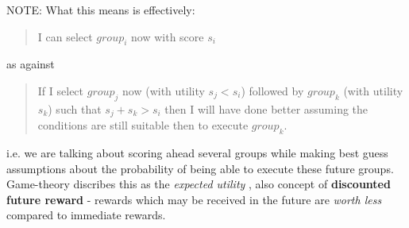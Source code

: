 NOTE: What this means is effectively: 
\begin{quote} 
I can select $group_i$ now with score $s_i$ 
\end{quote}

as against 

\begin{quote}If I select $group_j$ now (with utility $s_j < s_i$) followed by $group_k$ (with utility $s_k$) such that $s_j+s_k > s_i$ then I will have done better assuming the conditions are still suitable then to execute $group_k$.
\end{quote}

 i.e. we are talking about scoring ahead several groups while making best guess assumptions about the probability of being able to execute these future groups. Game-theory discribes this as the \emph{expected utility} \cite{vonneumann44games}, also concept of {\bf discounted future reward} - rewards which may be received in the future are \emph{worth less} compared to immediate rewards. 
